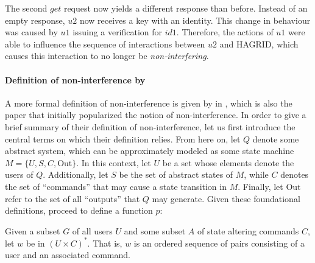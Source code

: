 The second \(get\) request now yields a different response than before. Instead of an empty response, \(u2\) now receives a key with an identity. This change in behaviour was caused by \(u1\) issuing a verification for \(id1\). Therefore, the actions of \(u1\) were able to influence the sequence of interactions between \(u2\) and HAGRID, which causes this interaction to no longer be \emph{non-interfering}.

\paragraph{Definition of non-interference by \citeauthor{Goguen_Meseguer_82}}
A more formal definition of non-interference is given by \citeauthor{Goguen_Meseguer_82} in , which is also the paper that initially popularized the notion of non-interference. 
In order to give a brief summary of their definition of non-interference, let us first introduce the central terms on which their definition relies. From here on, let \(Q\) denote some abstract system, which can be approximately modeled as some state machine \(M = \{U,S,C,\text{Out}\}\). 
In this context, let \(U\) be a set whose elements denote the users of \(Q\). Additionally, let \(S\) be the set of abstract states of \(M\), while \(C\) denotes the set of ``commands'' that may cause a state transition in \(M\). Finally, let \(\text{Out}\) refer to the set of all ``outputs'' that \(Q\) may generate. 
Given these foundational definitions, \citeauthor{Goguen_Meseguer_82} proceed to define a function \(p\): 

Given a subset \(G\) of all users \(U\) and some subset \(A\) of state altering commands \(C\), let \(w\) be in \((U \times C)^*\). That is, \(w\) is an ordered sequence of pairs consisting of a user and an associated command. 

